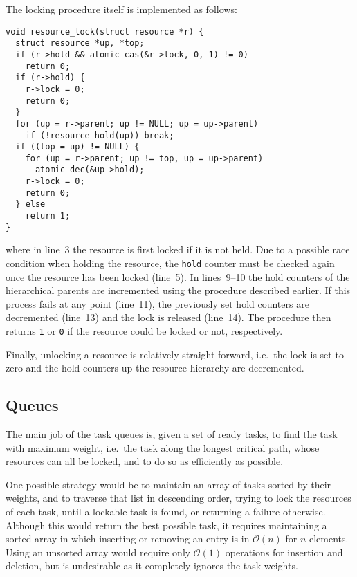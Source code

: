 \documentclass[fleqn,10pt]{wlpeerj}
\newcommand{\oh}[1]
    {\mbox{$ {\mathcal O}( #1 ) $}}
\begin{document}
The locking procedure itself is implemented as follows:
\begin{center}\begin{minipage}{0.9\textwidth}
    \begin{lstlisting}
void resource_lock(struct resource *r) {
  struct resource *up, *top;
  if (r->hold && atomic_cas(&r->lock, 0, 1) != 0)
    return 0;
  if (r->hold) {
    r->lock = 0;
    return 0;
  }
  for (up = r->parent; up != NULL; up = up->parent)
    if (!resource_hold(up)) break;
  if ((top = up) != NULL) {
    for (up = r->parent; up != top, up = up->parent)
      atomic_dec(&up->hold);
    r->lock = 0;
    return 0;
  } else
    return 1;
}
    \end{lstlisting}
\end{minipage}\end{center}
\noindent where in line~3 the resource is first locked if it
is not held.
Due to a possible race condition when holding the resource,
the {\tt hold} counter must be checked again once the resource
has been locked (line~5).
In lines~9--10 the hold counters of the hierarchical parents
are incremented using the procedure described earlier.
If this process fails at any point (line~11), the
previously set hold counters are decremented (line~13)
and the lock is released (line~14).
The procedure then returns {\tt 1} or {\tt 0} if the resource
could be locked or not, respectively.

Finally, unlocking a resource is relatively straight-forward,
i.e.~the lock is set to zero and the hold counters up the
resource hierarchy are decremented.


\subsection{Queues}

The main job of the task queues is, given a set of ready tasks,
to find the task with maximum weight, i.e.~the task along the
longest critical path, whose resources can all
be locked, and to do so as efficiently as possible.

One possible strategy would be to maintain an array of tasks
sorted by their weights, and to traverse that list in descending
order, trying to lock the resources of each task, until
a lockable task is found, or returning a failure otherwise.
Although this would return the best possible task, it
requires maintaining a sorted array in which inserting
or removing an entry is in \oh{n} for $n$ elements.
Using an unsorted array would require only \oh{1} operations for
insertion and deletion, but is undesirable as it completely
ignores the task weights.
\end{document}
